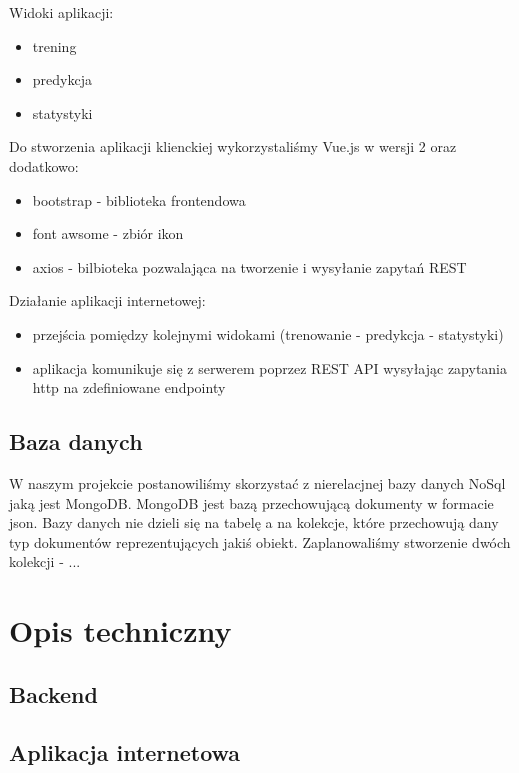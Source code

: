 \documentclass[a4paper, 11pt]{report}
\begin{document}
\noindent
Widoki aplikacji:
\begin{itemize}
\item trening
\item predykcja
\item statystyki
\end{itemize}

\noindent
Do stworzenia aplikacji klienckiej wykorzystaliśmy Vue.js w wersji 2 oraz dodatkowo:
\begin{itemize}
\item bootstrap - biblioteka frontendowa
\item font awsome - zbiór ikon
\item axios - bilbioteka pozwalająca na tworzenie i wysyłanie zapytań REST
\end{itemize}

\noindent
Działanie aplikacji internetowej:
\begin{itemize}
\item przejścia pomiędzy kolejnymi widokami (trenowanie - predykcja - statystyki)
\item aplikacja komunikuje się z serwerem poprzez REST API wysyłając zapytania http na zdefiniowane endpointy
\end{itemize}

	
	\section{Baza danych}
	
W naszym projekcie postanowiliśmy skorzystać z nierelacjnej bazy danych NoSql jaką jest MongoDB. MongoDB jest bazą przechowującą dokumenty w formacie json. Bazy danych nie dzieli się na tabelę a na kolekcje, które przechowują dany typ dokumentów reprezentujących jakiś obiekt. Zaplanowaliśmy stworzenie dwóch kolekcji - ...
		
\chapter{Opis techniczny}

	\section{Backend}
	
	\section{Aplikacja internetowa}
\end{document}
